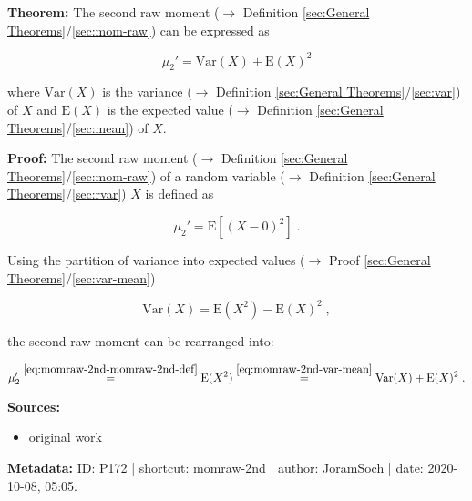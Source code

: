 \documentclass[a4paper,12pt,twoside]{book}
\begin{document}
\textbf{Theorem:} The second raw moment ($\rightarrow$ Definition \ref{sec:General Theorems}/\ref{sec:mom-raw}) can be expressed as

\begin{equation} \label{eq:momraw-2nd-momraw-2nd}
\mu_2' = \mathrm{Var}(X) + \mathrm{E}(X)^2
\end{equation}

where $\mathrm{Var}(X)$ is the variance ($\rightarrow$ Definition \ref{sec:General Theorems}/\ref{sec:var}) of $X$ and $\mathrm{E}(X)$ is the expected value ($\rightarrow$ Definition \ref{sec:General Theorems}/\ref{sec:mean}) of $X$.


\vspace{1em}
\textbf{Proof:} The second raw moment ($\rightarrow$ Definition \ref{sec:General Theorems}/\ref{sec:mom-raw}) of a random variable ($\rightarrow$ Definition \ref{sec:General Theorems}/\ref{sec:rvar}) $X$ is defined as

\begin{equation} \label{eq:momraw-2nd-momraw-2nd-def}
\mu_2' = \mathrm{E}\left[ (X-0)^2 \right] \; .
\end{equation}

Using the partition of variance into expected values ($\rightarrow$ Proof \ref{sec:General Theorems}/\ref{sec:var-mean})

\begin{equation} \label{eq:momraw-2nd-var-mean}
\mathrm{Var}(X) = \mathrm{E}(X^2) - \mathrm{E}(X)^2 \; ,
\end{equation}

the second raw moment can be rearranged into:

\begin{equation} \label{eq:momraw-2nd-momraw-2nd-qed}
\mu_2' \overset{\eqref{eq:momraw-2nd-momraw-2nd-def}}{=} \mathrm{E}(X^2) \overset{\eqref{eq:momraw-2nd-var-mean}}{=} \mathrm{Var}(X) + \mathrm{E}(X)^2 \; .
\end{equation}


\vspace{1em}
\textbf{Sources:}
\begin{itemize}
\item original work\end{itemize}


\vspace{1em}
\textbf{Metadata:} ID: P172 | shortcut: momraw-2nd | author: JoramSoch | date: 2020-10-08, 05:05.
\vspace{1em}
\end{document}
